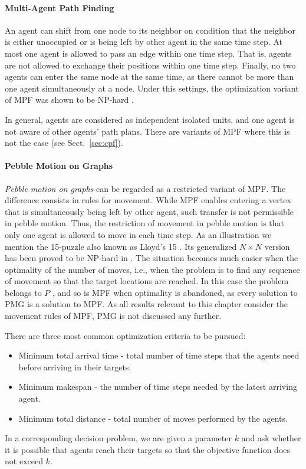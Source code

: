 \paragraph{Multi-Agent Path Finding}
An agent can shift from one node to its neighbor on condition that the neighbor is either unoccupied or is being left by other agent in the same time step. 
At most one agent is allowed to pass an edge within one time step. 
That is, agents are not allowed to exchange their positions within one time step.
Finally, no two agents can enter the same node at the same time, as there cannot be more than one agent simultaneously at a node.
Under this settings, the optimization variant of MPF was shown to be NP-hard \cite{surynek10}.

In general, agents are considered as independent isolated units, and one agent is not aware of other agents' path plans.
There are variants of MPF where this is not the case (see Sect.~\ref{sec:cpf}).

\paragraph{Pebble Motion on Graphs}
\emph{Pebble motion on graphs} \cite{kornhauser84} can be regarded as a restricted variant of MPF. 
The difference consists in rules for movement. 
While MPF enables entering a vertex that is simultaneously being left by other agent, such transfer is not permissible in pebble motion. 
Thus, the restriction of movement in pebble motion is that only one agent is allowed to move in each time step.
As an illustration we mention the 15-puzzle also known as Lloyd’s 15 \cite{archer99}.
Its generalized $N\times N$ version has been proved to be NP-hard in \cite{ratner86}.  
The situation becomes much easier when the optimality of the number of moves, i.e., when the problem is to find any sequence of movement so that the target locations are reached.
In this case the problem belongs to $P$ \cite{kornhauser84}, and so is MPF when optimality is abandoned, as every solution to PMG is a solution to MPF.
As all results relevant to this chapter consider the movement rules of MPF, PMG is not discussed any further.

There are three most common optimization criteria \cite{yu13} to be pursued:
\begin{itemize}
        \item Minimum total arrival time - total number of time steps that the agents need before arriving in their targets.
        \item Minimum makespan - the number of time steps needed by the latest arriving agent.
        \item Minimum total distance - total number of moves performed by the agents.
\end{itemize}
In a corresponding decision problem, we are given a parameter $k$ and ask whether it is possible that agents reach their targets so that the objective function does not exceed $k$.

